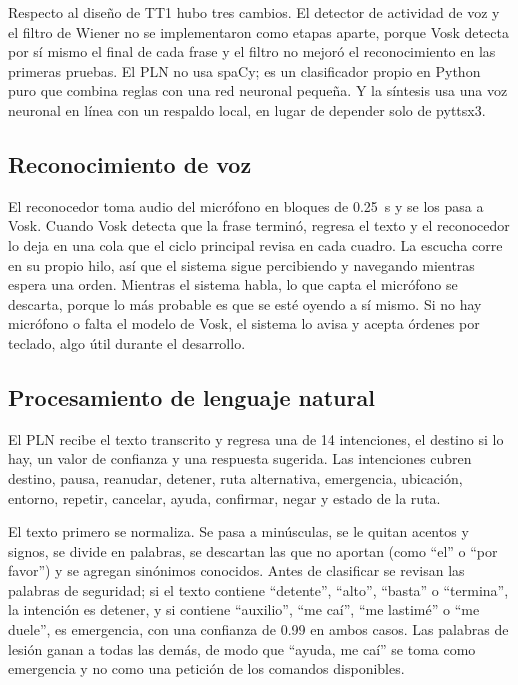 Respecto al diseño de TT1 hubo tres cambios. El detector de actividad de voz y el
filtro de Wiener no se implementaron como etapas aparte, porque Vosk detecta por sí
mismo el final de cada frase y el filtro no mejoró el reconocimiento en las primeras
pruebas. El PLN no usa spaCy; es un clasificador propio en Python puro que combina
reglas con una red neuronal pequeña. Y la síntesis usa una voz neuronal en línea con un
respaldo local, en lugar de depender solo de pyttsx3.

\subsection{Reconocimiento de voz}

El reconocedor toma audio del micrófono en bloques de 0.25~s y se los pasa a Vosk.
Cuando Vosk detecta que la frase terminó, regresa el texto y el reconocedor lo deja en
una cola que el ciclo principal revisa en cada cuadro. La escucha corre en su propio
hilo, así que el sistema sigue percibiendo y navegando mientras espera una orden.
Mientras el sistema habla, lo que capta el micrófono se descarta, porque lo más probable
es que se esté oyendo a sí mismo. Si no hay micrófono o falta el modelo de Vosk, el
sistema lo avisa y acepta órdenes por teclado, algo útil durante el desarrollo.

\subsection{Procesamiento de lenguaje natural}

El PLN recibe el texto transcrito y regresa una de 14 intenciones, el destino si lo hay,
un valor de confianza y una respuesta sugerida. Las intenciones cubren destino, pausa,
reanudar, detener, ruta alternativa, emergencia, ubicación, entorno, repetir, cancelar,
ayuda, confirmar, negar y estado de la ruta.

El texto primero se normaliza. Se pasa a minúsculas, se le quitan acentos y signos, se
divide en palabras, se descartan las que no aportan (como ``el'' o ``por favor'') y se
agregan sinónimos conocidos. Antes de clasificar se revisan las palabras de seguridad;
si el texto contiene ``detente'', ``alto'', ``basta'' o ``termina'', la intención es
detener, y si contiene ``auxilio'', ``me caí'', ``me lastimé'' o ``me duele'', es
emergencia, con una confianza de 0.99 en ambos casos. Las palabras de lesión ganan a
todas las demás, de modo que ``ayuda, me caí'' se toma como emergencia y no como una
petición de los comandos disponibles.

